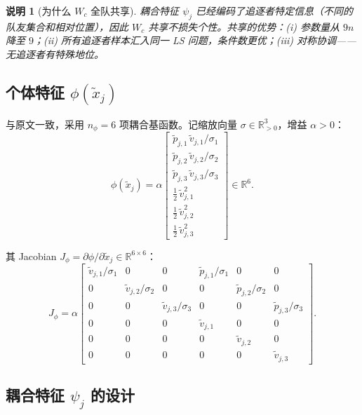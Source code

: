\documentclass[12pt,a4paper]{ctexart}
\newtheorem{remark}[theorem]{说明}
\begin{document}
\begin{remark}[为什么 $W_c$ 全队共享]
耦合特征 $\psi_j$ 已经编码了追逐者特定信息（不同的队友集合和相对位置），因此 $W_c$ 共享不损失个性。共享的优势：(i) 参数量从 $9n$ 降至 $9$；(ii) 所有追逐者样本汇入同一 LS 问题，条件数更优；(iii) 对称协调——无追逐者有特殊地位。
\end{remark}

\subsection{个体特征 $\phi(\tilde{x}_j)$}

与原文一致，采用 $n_\phi = 6$ 项耦合基函数。记缩放向量 $\sigma \in \mathbb{R}^3_{>0}$，增益 $\alpha > 0$：
\begin{equation}\label{eq:phi}
\phi(\tilde{x}_j) = \alpha \begin{bmatrix}
\tilde{p}_{j,1}\,\tilde{v}_{j,1} / \sigma_1 \\
\tilde{p}_{j,2}\,\tilde{v}_{j,2} / \sigma_2 \\
\tilde{p}_{j,3}\,\tilde{v}_{j,3} / \sigma_3 \\
\tfrac{1}{2}\,\tilde{v}_{j,1}^2 \\
\tfrac{1}{2}\,\tilde{v}_{j,2}^2 \\
\tfrac{1}{2}\,\tilde{v}_{j,3}^2
\end{bmatrix} \in \mathbb{R}^6.
\end{equation}

其 Jacobian $J_\phi = \partial\phi/\partial\tilde{x}_j \in \mathbb{R}^{6 \times 6}$：
\begin{equation}\label{eq:jac-phi}
J_\phi = \alpha \begin{bmatrix}
\tilde{v}_{j,1}/\sigma_1 & 0 & 0 & \tilde{p}_{j,1}/\sigma_1 & 0 & 0 \\
0 & \tilde{v}_{j,2}/\sigma_2 & 0 & 0 & \tilde{p}_{j,2}/\sigma_2 & 0 \\
0 & 0 & \tilde{v}_{j,3}/\sigma_3 & 0 & 0 & \tilde{p}_{j,3}/\sigma_3 \\
0 & 0 & 0 & \tilde{v}_{j,1} & 0 & 0 \\
0 & 0 & 0 & 0 & \tilde{v}_{j,2} & 0 \\
0 & 0 & 0 & 0 & 0 & \tilde{v}_{j,3}
\end{bmatrix}.
\end{equation}


\subsection{耦合特征 $\psi_j$ 的设计}\label{sec:coupling-feature}
\end{document}
